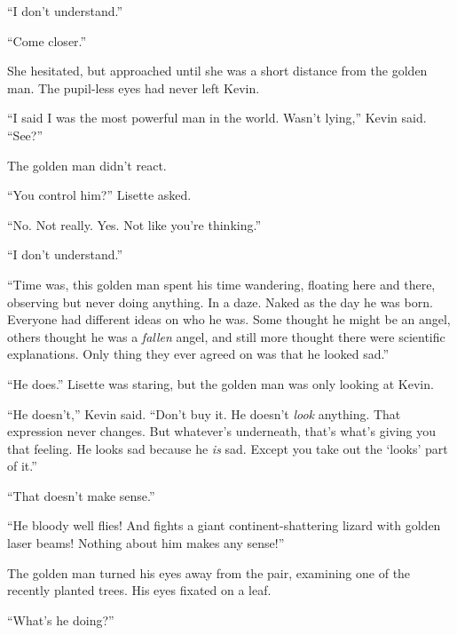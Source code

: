``I don't understand.''



``Come closer.''



She hesitated, but approached until she was a short distance from the golden man.  The pupil-less eyes had never left Kevin.



``I said I was the most powerful man in the world.  Wasn't lying,'' Kevin said.  ``See?''



The golden man didn't react.



``You control him?''  Lisette asked.



``No.  Not really.  Yes.  Not like you're thinking.''



``I don't understand.''



``Time was, this golden man spent his time wandering, floating here and there, observing but never doing anything.  In a daze.  Naked as the day he was born.  Everyone had different ideas on who he was.  Some thought he might be an angel, others thought he was a \emph{fallen} angel, and still more thought there were scientific explanations.  Only thing they ever agreed on was that he looked sad.''



``He does.'' Lisette was staring, but the golden man was only looking at Kevin.



``He doesn't,'' Kevin said.  ``Don't buy it.  He doesn't \emph{look} anything.  That expression never changes.  But whatever's underneath, that's what's giving you that feeling.  He looks sad because he \emph{is} sad.  Except you take out the `looks' part of it.''



``That doesn't make sense.''



``He bloody well flies!  And fights a giant continent-shattering lizard with golden laser beams!  Nothing about him makes any sense!''



The golden man turned his eyes away from the pair, examining one of the recently planted trees.  His eyes fixated on a leaf.



``What's he doing?''



